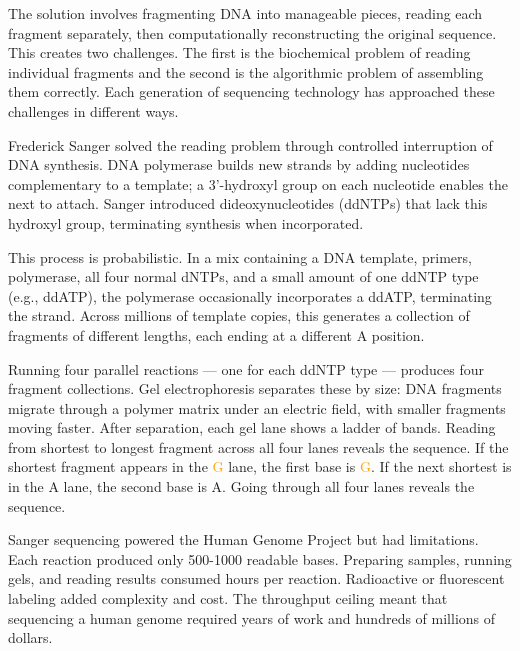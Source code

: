 The solution involves fragmenting DNA into manageable pieces, reading each fragment separately, then computationally reconstructing the original sequence. This creates two challenges. The first is the biochemical problem of reading individual fragments and the second is the algorithmic problem of assembling them correctly. Each generation of sequencing technology has approached these challenges in different ways.

Frederick Sanger solved the reading problem through controlled interruption of DNA synthesis. DNA polymerase builds new strands by adding nucleotides complementary to a template; a 3'-hydroxyl group on each nucleotide enables the next to attach. Sanger introduced dideoxynucleotides (ddNTPs) that lack this hydroxyl group, terminating synthesis when incorporated.

This process is probabilistic. In a mix containing a DNA template, primers, polymerase, all four normal dNTPs, and a small amount of one ddNTP type (e.g., dd\textcolor{green!60!black}{A}TP), the polymerase occasionally incorporates a dd\textcolor{green!60!black}{A}TP, terminating the strand. Across millions of template copies, this generates a collection of fragments of different lengths, each ending at a different \textcolor{green!60!black}{A} position.

Running four parallel reactions — one for each ddNTP type — produces four fragment collections. Gel electrophoresis separates these by size: DNA fragments migrate through a polymer matrix under an electric field, with smaller fragments moving faster. After separation, each gel lane shows a ladder of bands. Reading from shortest to longest fragment across all four lanes reveals the sequence. If the shortest fragment appears in the \textcolor{orange}{G} lane, the first base is \textcolor{orange}{G}. If the next shortest is in the \textcolor{green!60!black}{A} lane, the second base is \textcolor{green!60!black}{A}. Going through all four lanes reveals the sequence.

Sanger sequencing powered the Human Genome Project but had limitations. Each reaction produced only 500-1000 readable bases. Preparing samples, running gels, and reading results consumed hours per reaction. Radioactive or fluorescent labeling added complexity and cost. The throughput ceiling meant that sequencing a human genome required years of work and hundreds of millions of dollars.

